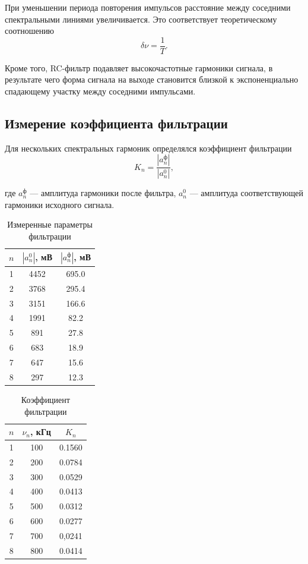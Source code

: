 \documentclass[14pt,a4paper]{extarticle}
\begin{document}
При уменьшении периода повторения импульсов расстояние между
соседними спектральными линиями увеличивается. Это соответствует
теоретическому соотношению
\[
\delta\nu=\frac{1}{T}.
\]

Кроме того, RC-фильтр подавляет высокочастотные гармоники сигнала,
в результате чего форма сигнала на выходе становится близкой к
экспоненциально спадающему участку между соседними импульсами.

\subsection{Измерение коэффициента фильтрации}

Для нескольких спектральных гармоник определялся коэффициент фильтрации
\begin{equation}
K_n=
\frac{|a_n^{\text{ф}}|}
{|a_n^0|},
\end{equation}

где $a_n^{\text{ф}}$ --- амплитуда гармоники после фильтра,
$a_n^0$ --- амплитуда соответствующей гармоники исходного сигнала.

\begin{table}[H]
\centering
\caption{Измеренные параметры фильтрации}
\begin{tabular}{c|c|c}
$n$ & $|a_n^{0}|$, мВ & $|a_n^{\text{ф}}|$, мВ \\
\hline
1 & 4452& 695.0 \\
2 & 3768& 295.4 \\
3 & 3151& 166.6 \\
4 & 1991& 82.2 \\
5 & 891&  27.8\\
6 & 683&  18.9\\
7 & 647&  15.6\\
8 & 297& 12.3
\end{tabular}
\end{table}

\begin{table}[H]
\centering
\caption{Коэффициент фильтрации}
\begin{tabular}{c|c|c}
$n$ & $\nu_n$, кГц & $K_n$ \\
\hline
1 & 100 & 0.1560\\
2 & 200 & 0.0784\\
3 & 300 & 0.0529\\
4 & 400 & 0.0413\\
5 & 500 & 0.0312\\
6 & 600 & 0.0277\\
7 & 700 & 0,0241\\
8 & 800 & 0.0414
\end{tabular}
\end{table}
\end{document}
